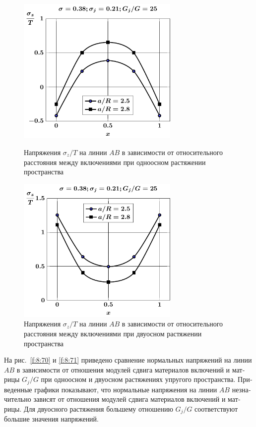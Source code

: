 \begin{russian}
\begin{figure}[h!]
\centering\footnotesize
\parbox[b]{7.5cm}{\centering\includegraphics[width=7.8cm]{inc9-a-d95-g25-t1-sig_z.pdf}
\caption{Напряжения $\sigma_z/T$ на линии  $AB$ в зависимости от относительного расстояния между включениями при одноосном растяжении пространства
\label{f:8:68}}}\hfil\hfil
\parbox[b]{7.5cm}{\centering\includegraphics[width=7.8cm]{inc9-a-d95-g25-t2-sig_z.pdf}
\caption{Напряжения $\sigma_z/T$ на линии  $AB$ в зависимости от относительного расстояния между включениями при двуосном растяжении пространства
\label{f:8:69}}}
\end{figure}

На рис.~\ref{f:8:70} и \ref{f:8:71} приведено сравнение нормальных напряжений на линии $AB$ в зависимости от отношения модулей сдвига материалов включений и матрицы $G_j/G$ при одноосном и двуосном растяжениях упругого пространства. Приведенные графики показывают, что нормальные напряжения на линии $AB$ незначительно зависят от отношения модулей сдвига материалов включений и матрицы. Для двуосного растяжения большему отношению $G_j/G$ соответствуют большие значения напряжений.


\end{russian}
